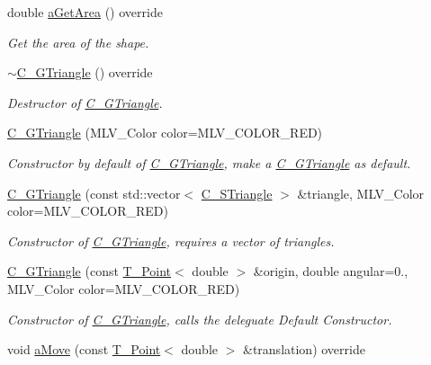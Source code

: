 \begin{DoxyCompactItemize}
double \hyperlink{classC__GTriangle_a4d1c9a050aef86a7eab973b1fe668544}{a\+Get\+Area} () override
\begin{DoxyCompactList}\small\item\em Get the area of the shape. \end{DoxyCompactList}\item 
\hyperlink{classC__GTriangle_ad904f86d6bde64caabd005b3bad333e2}{$\sim$\+C\+\_\+\+G\+Triangle} () override
\begin{DoxyCompactList}\small\item\em Destructor of \hyperlink{classC__GTriangle}{C\+\_\+\+G\+Triangle}. \end{DoxyCompactList}\item 
\hyperlink{classC__GTriangle_aba5786a8cd754d526758e05df3f70a51}{C\+\_\+\+G\+Triangle} (M\+L\+V\+\_\+\+Color color=M\+L\+V\+\_\+\+C\+O\+L\+O\+R\+\_\+\+R\+ED)
\begin{DoxyCompactList}\small\item\em Constructor by default of \hyperlink{classC__GTriangle}{C\+\_\+\+G\+Triangle}, make a \hyperlink{classC__GTriangle}{C\+\_\+\+G\+Triangle} as default. \end{DoxyCompactList}\item 
\hyperlink{classC__GTriangle_a45212ea205ed1860ac57b048af9fd984}{C\+\_\+\+G\+Triangle} (const std\+::vector$<$ \hyperlink{classC__STriangle}{C\+\_\+\+S\+Triangle} $>$ \&triangle, M\+L\+V\+\_\+\+Color color=M\+L\+V\+\_\+\+C\+O\+L\+O\+R\+\_\+\+R\+ED)
\begin{DoxyCompactList}\small\item\em Constructor of \hyperlink{classC__GTriangle}{C\+\_\+\+G\+Triangle}, requires a vector of triangles. \end{DoxyCompactList}\item 
\hyperlink{classC__GTriangle_a2dc558251c2bd2591451e61f0d66714b}{C\+\_\+\+G\+Triangle} (const \hyperlink{classT__Point}{T\+\_\+\+Point}$<$ double $>$ \&origin, double angular=0., M\+L\+V\+\_\+\+Color color=M\+L\+V\+\_\+\+C\+O\+L\+O\+R\+\_\+\+R\+ED)
\begin{DoxyCompactList}\small\item\em Constructor of \hyperlink{classC__GTriangle}{C\+\_\+\+G\+Triangle}, calls the deleguate Default Constructor. \end{DoxyCompactList}\item 
void \hyperlink{classC__GTriangle_a07789441ce75f81fd4c4649a0115edbe}{a\+Move} (const \hyperlink{classT__Point}{T\+\_\+\+Point}$<$ double $>$ \&translation) override

\end{DoxyCompactItemize}
